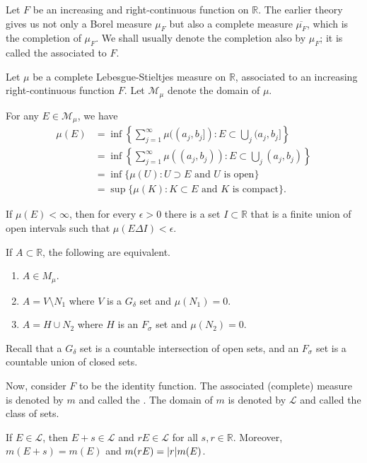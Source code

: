 \documentclass[12pt]{article}	%
\begin{document}
Let $F$ be an increasing and right-continuous function on $\mathbb{R}$. The earlier theory gives us not only a Borel measure $\mu_{F}$ but also a complete measure $\overline{\mu_{F}}$, which is the completion of $\mu_{F}$. We shall usually denote the completion also by $\mu_{F}$; it is called the associated to $F$.

\begin{prop}
	Let $\mu$ be a complete Lebesgue-Stieltjes measure on $\mathbb{R}$, associated to an increasing right-continuous function $F$. Let $\mathcal{M}_{\mu}$ denote the domain of $\mu$.

 	For any $E \in \mathcal{M}_{\mu}$, we have
 	\begin{align*} 
 		\mu(E) &= \inf\left\{\sum_{j = 1}^{\infty} \mu((a_{j}, b_{j}]) : E \subset \bigcup_{j} (a_{j}, b_{j}]\right\} \\
 		&= \inf\left\{\sum_{j = 1}^{\infty} \mu((a_{j}, b_{j})) : E \subset \bigcup_{j} (a_{j}, b_{j})\right\} \\
 		&= \inf\{\mu(U) : U \supset E \text{ and $U$ is open}\} \\
 		&= \sup\{\mu(K) : K \subset E \text{ and $K$ is compact}\}.
 	\end{align*}

 	If $\mu(E) < \infty$, then for every $\epsilon > 0$ there is a set $I \subset \mathbb{R}$ that is a finite union of open intervals such that $\mu(E \Delta I) < \epsilon$.

 	If $A \subset \mathbb{R}$, the following are equivalent.
 	\begin{enumerate}
 		\item $A \in M_{\mu}$.
 		\item $A = V \setminus N_{1}$ where $V$ is a $G_{\delta}$ set and $\mu(N_{1}) = 0$.
 		\item $A = H \cup N_{2}$ where $H$ is an $F_{\sigma}$ set and $\mu(N_{2}) = 0$.
 	\end{enumerate}
\end{prop} 
Recall that a $G_{\delta}$ set is a countable intersection of open sets, and an $F_{\sigma}$ set is a countable union of closed sets.

Now, consider $F$ to be the identity function. The associated (complete) measure is denoted by $m$ and called the . The domain of $m$ is denoted by $\mathcal{L}$ and called the class of  sets.

\begin{prop}
	If $E \in \mathcal{L}$, then $E + s \in \mathcal{L}$ and $r E \in \mathcal{L}$ for all $s, r \in \mathbb{R}$. Moreover, $m(E + s) = m(E)$ and $m(rE) = {\left\lvert r \right\lvert} m(E)$.
\end{prop}
\end{document}
